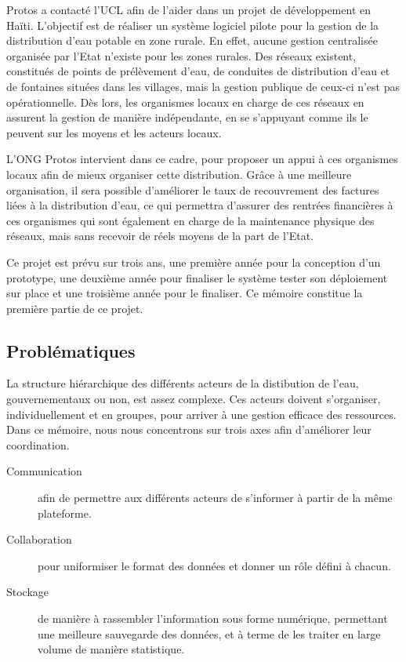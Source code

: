 \documentclass{EPL-master-thesis-covers-FR}
\begin{document}
			Protos a contacté l'UCL afin de l'aider dans un projet de développement en Haïti. L'objectif est de réaliser un système logiciel pilote pour la gestion de la distribution d'eau potable en zone rurale. En effet, aucune gestion centralisée organisée par l'Etat n'existe pour les zones rurales. Des réseaux existent, constitués de points de prélèvement d'eau, de conduites de distribution d'eau et de fontaines situées dans les villages, mais la gestion publique de ceux-ci n'est pas opérationnelle. Dès lors, les organismes locaux en charge de ces réseaux en assurent la gestion de manière indépendante, en se s'appuyant comme ils le peuvent sur les moyens et les acteurs locaux.

			L'ONG Protos intervient dans ce cadre, pour proposer un appui à ces organismes locaux afin de mieux organiser cette distribution. Grâce à une meilleure organisation, il sera possible d'améliorer le taux de recouvrement des factures liées à la distribution d'eau, ce qui permettra d'assurer des rentrées financières à ces organismes qui sont également en charge de la maintenance physique des réseaux, mais sans recevoir de réels moyens de la part de l'Etat.

			Ce projet est prévu sur trois ans, une première année pour la conception d'un prototype, une deuxième année pour finaliser le système tester son déploiement sur place et une troisième année pour le finaliser. Ce mémoire constitue la première partie de ce projet.

		\subsection*{Problématiques}

			La structure hiérarchique des différents acteurs de la distibution de l'eau, gouvernementaux ou non, est assez complexe. Ces acteurs doivent s'organiser, individuellement et en groupes, pour arriver à une gestion efficace des ressources. Dans ce mémoire, nous nous concentrons sur trois axes afin d'améliorer leur coordination.

			\begin{description}
				\item[Communication] afin de permettre aux différents acteurs de s'informer à partir de la même plateforme.
				\item[Collaboration] pour uniformiser le format des données et donner un rôle défini à chacun.
				\item[Stockage] de manière à rassembler l'information sous forme numérique, permettant une meilleure sauvegarde des données, et à terme de les traiter en large volume de manière statistique.
			\end{description}
\end{document}
